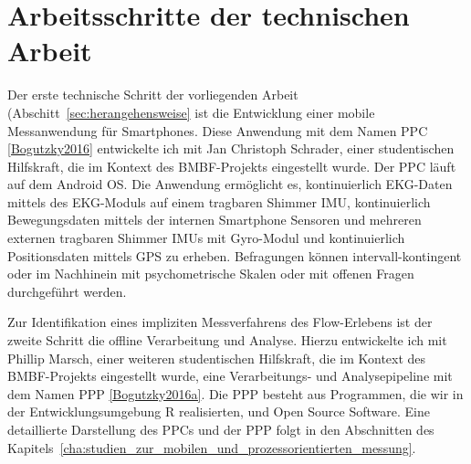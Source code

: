

\section{Arbeitsschritte der technischen Arbeit} 

\label{sec:arbeitsschritte_der_technischen_arbeit}

Der erste technische Schritt der vorliegenden Arbeit (Abschitt~\ref{sec:herangehensweise} ist die Entwicklung einer mobile Messanwendung für Smartphones. Diese Anwendung mit dem Namen \ac{PPC} \ref{Bogutzky2016} entwickelte ich mit Jan Christoph Schrader, einer studentischen Hilfskraft, die im Kontext des \ac{BMBF}-Projekts eingestellt wurde. Der \ac{PPC} läuft auf dem Android OS. Die Anwendung ermöglicht es, kontinuierlich \ac{EKG}-Daten mittels des \ac{EKG}-Moduls auf einem tragbaren Shimmer \ac{IMU}, kontinuierlich Bewegungsdaten mittels der internen Smartphone Sensoren und mehreren externen tragbaren Shimmer \ac{IMU}s mit Gyro-Modul und kontinuierlich Positionsdaten mittels \ac{GPS} zu erheben. Befragungen können intervall-kontingent oder im Nachhinein mit psychometrische Skalen oder mit offenen Fragen durchgeführt werden.

Zur Identifikation eines impliziten Messverfahrens des Flow-Erlebens ist der zweite Schritt die offline Verarbeitung und Analyse. Hierzu entwickelte ich mit Phillip Marsch, einer weiteren studentischen Hilfskraft, die im Kontext des \ac{BMBF}-Projekts eingestellt wurde, eine Verarbeitungs- und Analysepipeline mit dem Namen \ac{PPP} \ref{Bogutzky2016a}. Die \ac{PPP} besteht aus Programmen, die wir in der Entwicklungsumgebung R realisierten, und Open Source Software. Eine detaillierte Darstellung des \ac{PPC}s und der \ac{PPP} folgt in den Abschnitten des Kapitels~\ref{cha:studien_zur_mobilen_und_prozessorientierten_messung}.

